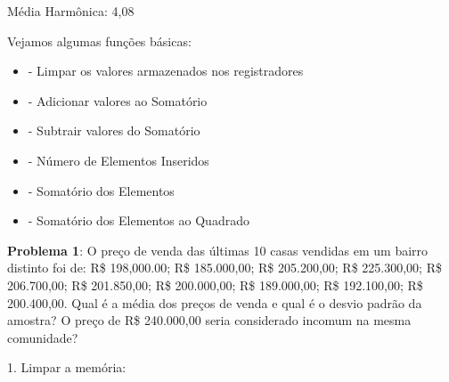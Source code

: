 Média Harmônica: 4,08 \\
 \keystroke{$\sum$} 
  \keystroke{$\sum+$} 
  \keystroke{$\sum+$} 
  \keystroke{$\sum+$} 
  \keystroke{$\sum+$} 
  \keystroke{$\sum+$} 
  

Vejamos algumas funções básicas: \vspace{-1em}
\begin{itemize}
	\item {} \keystroke{$\sum$} - Limpar os valores armazenados nos registradores
	\item \keystroke{$\sum+$} - Adicionar valores ao Somatório
	\item {} \keystroke{$\sum-$} - Subtrair valores do Somatório
	\item {}  - Número de Elementos Inseridos
	\item {}  - Somatório dos Elementos
	\item {}  - Somatório dos Elementos ao Quadrado
\end{itemize}

\textbf{Problema 1}: O preço de venda das últimas 10 casas vendidas em um bairro distinto foi de: R\$ 198,000.00; R\$ 185.000,00; R\$ 205.200,00; R\$ 225.300,00; R\$ 206.700,00; R\$ 201.850,00; R\$ 200.000,00; R\$ 189.000,00; R\$ 192.100,00; R\$ 200.400,00. Qual é a média dos preços de venda e qual é o desvio padrão da amostra? O preço de R\$ 240.000,00 seria considerado incomum na mesma comunidade?

1. Limpar a memória: \\
 \keystroke{$\sum$}

